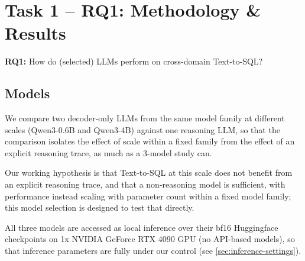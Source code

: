 \section{Task 1 -- RQ1: Methodology \& Results}
\label{sec:rq1-methods}

\textbf{RQ1:} How do (selected) LLMs perform on cross-domain Text-to-SQL?


\subsection{Models}
\label{sec:models}

We compare two decoder-only LLMs from the same model family at different scales (Qwen3-0.6B and Qwen3-4B) against one reasoning LLM, so that the comparison isolates the effect of scale within a fixed family from the effect of an explicit reasoning trace, as much as a 3-model study can. 

Our working hypothesis is that Text-to-SQL at this scale does not benefit from an explicit reasoning trace, and that a non-reasoning model is sufficient, with performance instead scaling with parameter count within a fixed model family; this model selection is designed to test that directly. 

All three models are accessed as local inference over their bf16 Huggingface checkpoints on 1x NVIDIA GeForce RTX 4090 GPU (no API-based models), so that inference parameters are fully under our control (see \ref{sec:inference-settings}).

\begin{table}[H]
\centering
\footnotesize
\caption{Models compared in RQ1.}
\label{tab:models}
\end{table}

